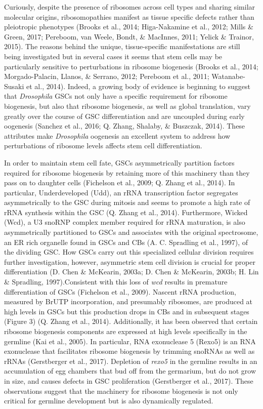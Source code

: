 \documentclass[12pt,oneside]{reedthesis}
\begin{document}
Curiously, despite the presence of ribosomes across cell types and
sharing similar molecular origins, ribosomopathies manifest as tissue
specific defects rather than pleiotropic phenotypes (Brooks et al., 2014; Higa-Nakamine et al., 2012; Mills \& Green, 2017; Pereboom, van Weele, Bondt, \& MacInnes, 2011; Yelick \& Trainor, 2015).
The reasons behind the unique, tissue-specific manifestations are still
being investigated but in several cases it seems that stem cells may be
particularly sensitive to perturbations in ribosome biogenesis
(Brooks et al., 2014; Morgado-Palacin, Llanos, \& Serrano, 2012; Pereboom et al., 2011; Watanabe-Susaki et al., 2014). Indeed, a growing body of evidence is beginning
to suggest that \emph{Drosophila} GSCs not only have a specific requirement
for ribosome biogenesis, but also that ribosome biogenesis, as well as
global translation, vary greatly over the course of GSC differentiation
and are uncoupled during early oogenesis (Sanchez et al., 2016; Q. Zhang, Shalaby, \& Buszczak, 2014). These attributes make \emph{Drosophila} oogenesis an
excellent system to address how perturbations of ribosome levels affects
stem cell differentiation.

In order to maintain stem cell fate, GSCs asymmetrically partition
factors required for ribosome biogenesis by retaining more of this
machinery than they pass on to daughter cells (Fichelson et al., 2009; Q. Zhang et al., 2014). In particular, Underdeveloped (Udd), an rRNA
transcription factor segregates asymmetrically to the GSC during mitosis
and seems to promote a high rate of rRNA synthesis within the GSC
(Q. Zhang et al., 2014). Furthermore, Wicked (Wcd), a U3 snoRNP complex member
required for rRNA maturation, is also asymmetrically partitioned to GSCs
and associates with the original spectrosome, an ER rich organelle found
in GSCs and CBs (A. C. Spradling et al., 1997), of the dividing GSC. How GSCs
carry out this specialized cellular division requires further
investigation, however, asymmetric stem cell division is crucial for
proper differentiation (D. Chen \& McKearin, 2003a; D. Chen \& McKearin, 2003b; H. Lin \& Spradling, 1997).Consistent with this loss of \emph{wcd} results in premature
differentiation of GSCs (Fichelson et al., 2009). Nascent rRNA production,
measured by BrUTP incorporation, and presumably ribosomes, are produced
at high levels in GSCs but this production drops in CBs and in
subsequent stages (Figure 3) (Q. Zhang et al., 2014). Additionally, it has been
observed that certain ribosome biogenesis components are expressed at
high levels specifically in the germline (Kai et al., 2005). In particular,
RNA exonuclease 5 (Rexo5) is an RNA exonuclease that facilitates
ribosome biogenesis by trimming snoRNAs as well as rRNAs
(Gerstberger et al., 2017). Depletion of \emph{rexo5} in the germline results in
an accumulation of egg chambers that bud off from the germarium, but do
not grow in size, and causes defects in GSC proliferation
(Gerstberger et al., 2017). These observations suggest that the machinery for
ribosome biogenesis is not only critical for germline development but is
also dynamically regulated.
\end{document}
